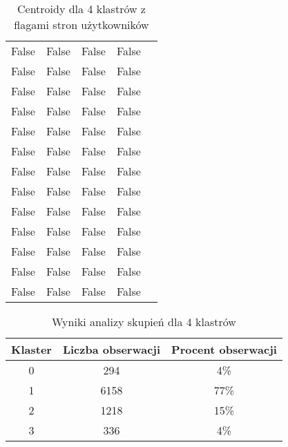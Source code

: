 \documentclass[../EDI_Task3_Karwowski_Kowalewski.tex]{subfiles}
\begin{document}
{{\begin{table}[!htbp]
\begin{tabular}{|c|c|c|c|c|}
                 False   &   False   &   False   &   False \\
                 False   &   False   &   False   &   False \\
                 False   &   False   &   False   &   False \\
                 False   &   False   &   False   &   False \\
                 False   &   False   &   False   &   False \\
                 False   &   False   &   False   &   False \\
                 False   &   False   &   False   &   False \\
                 False   &   False   &   False   &   False \\
                 False   &   False   &   False   &   False \\
                 False   &   False   &   False   &   False \\
                 False   &   False   &   False   &   False \\
                 False   &   False   &   False   &   False \\
                 False   &   False   &   False   &   False \\ \hline
            \end{tabular}
            \caption{Centroidy dla 4 klastrów z flagami stron użytkowników}
        \end{table}

        \begin{table}[!htbp]
            \small
            \centering
            \begin{tabular}{|c|c|c|}
                \hline
                Klaster & Liczba obserwacji & Procent obserwacji \\ \hline
                0 & 294 & 4\% \\
                1 & 6158 & 77\% \\
                2 & 1218 & 15\% \\
                3 & 336 & 4\% \\ \hline
            \end{tabular}
            \caption{Wyniki analizy skupień dla 4 klastrów}
        \end{table}

}}
\end{document}
